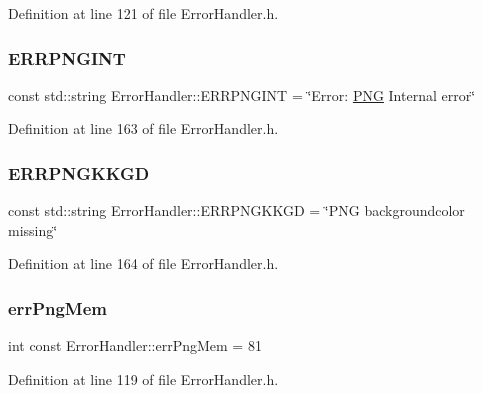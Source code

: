 Definition at line 121 of file Error\+Handler.\+h.

\mbox{\label{classErrorHandler_a050e436624ffa1bf418075c4d20befe7}} 
\subsubsection{\texorpdfstring{ERRPNGINT}{ERRPNGINT}}
{\footnotesize\ttfamily const std\+::string Error\+Handler\+::\+E\+R\+R\+P\+N\+G\+I\+NT = \char`\"{}Error\+: \mbox{\hyperlink{constants_8h_afac9cfa577b92c66f46f7603f2f9fc14}{P\+NG}} Internal error\char`\"{}\hspace{0.3cm}{\ttfamily [static]}}



Definition at line 163 of file Error\+Handler.\+h.

\mbox{\label{classErrorHandler_ad9b65ee3a71ddf4ef50a83035236a41b}} 
\subsubsection{\texorpdfstring{ERRPNGKKGD}{ERRPNGKKGD}}
{\footnotesize\ttfamily const std\+::string Error\+Handler\+::\+E\+R\+R\+P\+N\+G\+K\+K\+GD = \char`\"{}P\+NG backgroundcolor missing\char`\"{}\hspace{0.3cm}{\ttfamily [static]}}



Definition at line 164 of file Error\+Handler.\+h.

\mbox{\label{classErrorHandler_a07cc422c69b1e7138800ec16524bd9e4}} 
\subsubsection{\texorpdfstring{errPngMem}{errPngMem}}
{\footnotesize\ttfamily int const Error\+Handler\+::err\+Png\+Mem = 81\hspace{0.3cm}{\ttfamily [static]}}



Definition at line 119 of file Error\+Handler.\+h.

